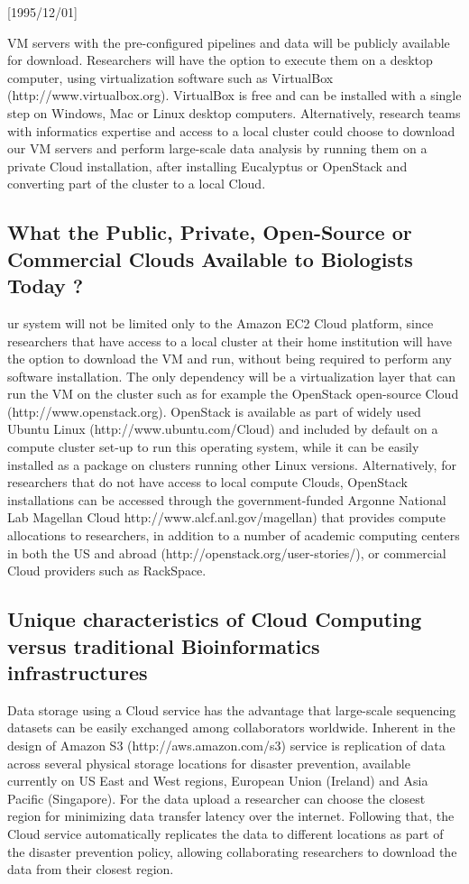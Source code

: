 \NeedsTeXFormat{LaTeX2e}[1995/12/01] \documentclass[10pt]{bmc_article}
\newenvironment{bmcformat}{\begin{raggedright}\baselineskip20pt\sloppy\setboolean{publ}{false}}{\end{raggedright}\baselineskip20pt\sloppy}
\begin{document}
\begin{bmcformat}
VM servers with the pre-configured pipelines and data will be publicly available for download. Researchers
will have the option to execute them on a desktop computer, using virtualization software such as VirtualBox
(http://www.virtualbox.org). VirtualBox is free and can be installed with a single step on Windows, Mac or
Linux desktop computers.  Alternatively, research teams with informatics expertise and access to a local
cluster could choose to download our VM servers and perform large-scale data analysis by running them on a
private Cloud installation, after installing Eucalyptus or OpenStack and converting part of the cluster to a
local Cloud. 

\subsection*{What the Public, Private, Open-Source or Commercial Clouds Available to Biologists Today ?} 

ur system will not be limited only to the Amazon EC2 Cloud platform, since researchers that have access to a
local cluster at their home institution will have the option to download the VM and run, without being
required to perform any software installation.  The only dependency will be a virtualization layer that can
run the VM on the cluster such as for example the OpenStack open-source Cloud (http://www.openstack.org).
OpenStack is available as part of widely used Ubuntu Linux (http://www.ubuntu.com/Cloud) and included by
default on a compute cluster set-up to run this operating system, while it can be easily installed as a
package on clusters running other Linux versions. Alternatively, for researchers that do not have access to
local compute Clouds, OpenStack installations can be accessed through the government-funded Argonne National
Lab Magellan Cloud http://www.alcf.anl.gov/magellan) that provides compute allocations to researchers, in
addition to a number of academic computing centers in both the US and abroad
(http://openstack.org/user-stories/), or commercial Cloud providers such as RackSpace.

\subsection*{Unique characteristics of Cloud Computing versus traditional Bioinformatics infrastructures}

Data storage using a Cloud service has the advantage that large-scale sequencing datasets can be easily
exchanged among collaborators worldwide. Inherent in the design of Amazon S3 (http://aws.amazon.com/s3)
service is replication of data across several physical storage locations for disaster prevention, available
currently on US East and West regions, European Union (Ireland) and Asia Pacific (Singapore). For the data
upload a researcher can choose the closest region for minimizing data transfer latency over the internet.
Following that, the Cloud service automatically replicates the data to different locations as part of the
disaster prevention policy, allowing collaborating researchers to download the data from their closest region.


\end{bmcformat}
\end{document}
